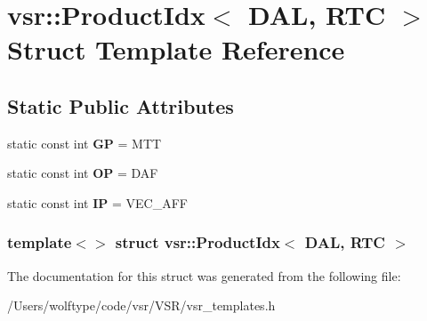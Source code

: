 \hypertarget{structvsr_1_1_product_idx_3_01_d_a_l_00_01_r_t_c_01_4}{\section{vsr\-:\-:Product\-Idx$<$ D\-A\-L, R\-T\-C $>$ Struct Template Reference}
\label{structvsr_1_1_product_idx_3_01_d_a_l_00_01_r_t_c_01_4}
}
\subsection*{Static Public Attributes}
\begin{DoxyCompactItemize}
\item 
\hypertarget{structvsr_1_1_product_idx_3_01_d_a_l_00_01_r_t_c_01_4_a2a1635470b6d04af6b90456329560c7e}{static const int {\bfseries G\-P} = M\-T\-T}\label{structvsr_1_1_product_idx_3_01_d_a_l_00_01_r_t_c_01_4_a2a1635470b6d04af6b90456329560c7e}

\item 
\hypertarget{structvsr_1_1_product_idx_3_01_d_a_l_00_01_r_t_c_01_4_a1a270757307cf89b7185c5c2298b422e}{static const int {\bfseries O\-P} = D\-A\-F}\label{structvsr_1_1_product_idx_3_01_d_a_l_00_01_r_t_c_01_4_a1a270757307cf89b7185c5c2298b422e}

\item 
\hypertarget{structvsr_1_1_product_idx_3_01_d_a_l_00_01_r_t_c_01_4_a4fb1bde1adc9e77f369c9737d64da396}{static const int {\bfseries I\-P} = V\-E\-C\-\_\-\-A\-F\-F}\label{structvsr_1_1_product_idx_3_01_d_a_l_00_01_r_t_c_01_4_a4fb1bde1adc9e77f369c9737d64da396}

\end{DoxyCompactItemize}
\subsubsection*{template$<$$>$ struct vsr\-::\-Product\-Idx$<$ D\-A\-L, R\-T\-C $>$}



The documentation for this struct was generated from the following file\-:\begin{DoxyCompactItemize}
\item 
/\-Users/wolftype/code/vsr/\-V\-S\-R/vsr\-\_\-templates.\-h\end{DoxyCompactItemize}
